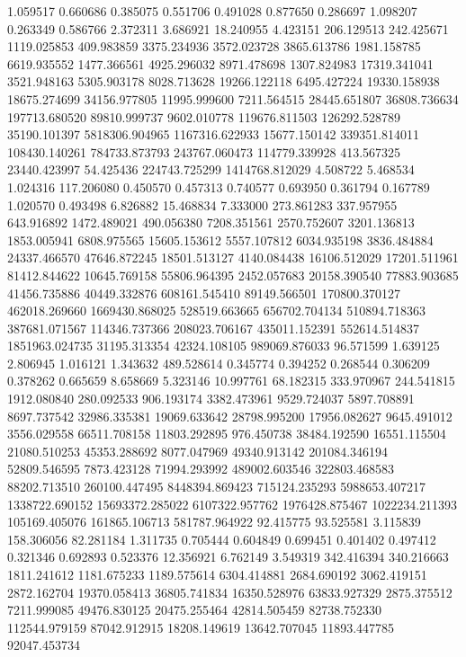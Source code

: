 1.059517
0.660686
0.385075
0.551706
0.491028
0.877650
0.286697
1.098207
0.263349
0.586766
2.372311
3.686921
18.240955
4.423151
206.129513
242.425671
1119.025853
409.983859
3375.234936
3572.023728
3865.613786
1981.158785
6619.935552
1477.366561
4925.296032
8971.478698
1307.824983
17319.341041
3521.948163
5305.903178
8028.713628
19266.122118
6495.427224
19330.158938
18675.274699
34156.977805
11995.999600
7211.564515
28445.651807
36808.736634
197713.680520
89810.999737
9602.010778
119676.811503
126292.528789
35190.101397
5818306.904965
1167316.622933
15677.150142
339351.814011
108430.140261
784733.873793
243767.060473
114779.339928
413.567325
23440.423997
54.425436
224743.725299
1414768.812029
4.508722
5.468534
1.024316
117.206080
0.450570
0.457313
0.740577
0.693950
0.361794
0.167789
1.020570
0.493498
6.826882
15.468834
7.333000
273.861283
337.957955
643.916892
1472.489021
490.056380
7208.351561
2570.752607
3201.136813
1853.005941
6808.975565
15605.153612
5557.107812
6034.935198
3836.484884
24337.466570
47646.872245
18501.513127
4140.084438
16106.512029
17201.511961
81412.844622
10645.769158
55806.964395
2452.057683
20158.390540
77883.903685
41456.735886
40449.332876
608161.545410
89149.566501
170800.370127
462018.269660
1669430.868025
528519.663665
656702.704134
510894.718363
387681.071567
114346.737366
208023.706167
435011.152391
552614.514837
1851963.024735
31195.313354
42324.108105
989069.876033
96.571599
1.639125
2.806945
1.016121
1.343632
489.528614
0.345774
0.394252
0.268544
0.306209
0.378262
0.665659
8.658669
5.323146
10.997761
68.182315
333.970967
244.541815
1912.080840
280.092533
906.193174
3382.473961
9529.724037
5897.708891
8697.737542
32986.335381
19069.633642
28798.995200
17956.082627
9645.491012
3556.029558
66511.708158
11803.292895
976.450738
38484.192590
16551.115504
21080.510253
45353.288692
8077.047969
49340.913142
201084.346194
52809.546595
7873.423128
71994.293992
489002.603546
322803.468583
88202.713510
260100.447495
8448394.869423
715124.235293
5988653.407217
1338722.690152
15693372.285022
6107322.957762
1976428.875467
1022234.211393
105169.405076
161865.106713
581787.964922
92.415775
93.525581
3.115839
158.306056
82.281184
1.311735
0.705444
0.604849
0.699451
0.401402
0.497412
0.321346
0.692893
0.523376
12.356921
6.762149
3.549319
342.416394
340.216663
1811.241612
1181.675233
1189.575614
6304.414881
2684.690192
3062.419151
2872.162704
19370.058413
36805.741834
16350.528976
63833.927329
2875.375512
7211.999085
49476.830125
20475.255464
42814.505459
82738.752330
112544.979159
87042.912915
18208.149619
13642.707045
11893.447785
92047.453734
